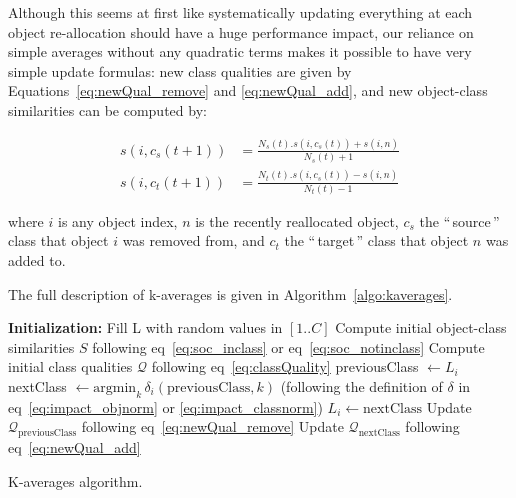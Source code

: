 \documentclass[a4paper,twoside]{article}
\newcommand{\gl}[1]{``\,#1\,''} %
\begin{document}
Although this seems at first like systematically updating everything at each object re-allocation should have a huge performance impact, our reliance on simple averages without any quadratic terms makes it possible to have very simple update formulas: new class qualities are given by Equations~\ref{eq:newQual_remove} and \ref{eq:newQual_add}, and new object-class similarities can be computed by:

\begin{equation}
	\begin{aligned}
    s(i, c_s(t+1)) &= \frac{N_s(t).s(i, c_s(t)) + s(i,n)}{N_s(t)+1} \\
    s(i, c_t(t+1)) &= \frac{N_t(t).s(i, c_s(t)) - s(i,n)}{N_t(t)-1}
   	\end{aligned}
  \label{eq:newSimilNewC}
\end{equation}

where $i$ is any object index, $n$ is the recently reallocated object, $c_s$ the \gl{source} class that object $i$ was removed from, and $c_t$ the \gl{target} class that object $n$ was added to.

The full description of k-averages is given in Algorithm~\ref{algo:kaverages}.

\begin{algorithm}
	\label{algo:kaverages}
	\SetAlgoLined
	\BlankLine	
	\textbf{Initialization:}
		Fill L with random values in $[1..C]$\;
		Compute initial object-class similarities $S$ following eq~\ref{eq:soc_inclass} or eq~\ref{eq:soc_notinclass}\;
		Compute initial class qualities $\mathcal{Q}$ following eq~\ref{eq:classQuality}\;
	\BlankLine	
	 {
		 {
			previousClass $\leftarrow L_i$\;
			nextClass $\leftarrow \mathrm{argmin}_k\,\delta_i(\mathrm{previousClass}, k)$ \label{algline:kaverages_search}
			(following the definition of $\delta$ in eq~\ref{eq:impact_objnorm} or \ref{eq:impact_classnorm})\;
			 {
				$L_i \leftarrow \mathrm{nextClass}$\;
				Update $\mathcal{Q}_\mathrm{previousClass}$ following eq~\ref{eq:newQual_remove}\;
				Update $\mathcal{Q}_\mathrm{nextClass}$ following eq~\ref{eq:newQual_add}\;
			}
		}
	}
	\BlankLine
	\caption{K-averages algorithm.}
\end{algorithm}
\end{document}
